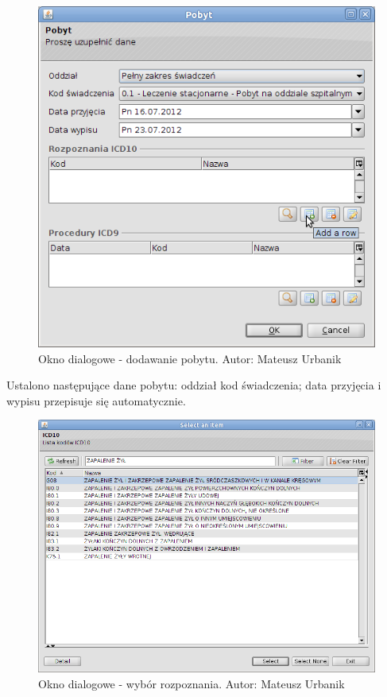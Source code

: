 \begin{figure}%
\centering
\includegraphics[scale=0.4]{images/gruper2}
\caption[Widok grupera]{Okno dialogowe - dodawanie pobytu. Autor: Mateusz Urbanik}
\label{img:gruper2}
\end{figure}

Ustalono następujące dane pobytu: oddział kod świadczenia; data przyjęcia i wypisu przepisuje się automatycznie.

\begin{figure}%
\centering
\includegraphics[scale=0.4]{images/gruper3}
\caption[Widok grupera]{Okno dialogowe - wybór rozpoznania. Autor: Mateusz Urbanik}
\label{img:gruper3}
\end{figure}

